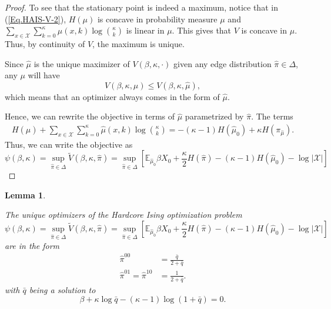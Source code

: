 \documentclass[12pt]{article}
\newtheorem{lemma}[theorem]{Lemma}
\numberwithin{equation}{section}
\begin{document}
\begin{proof}
    To see that the stationary point is indeed a maximum, notice that in (\ref{Eq.HAIS-V-2}), $H(\mu)$ is concave in probability measure $\mu$ and $\sum_{x\in\mathcal{X}}\sum_{k=0}^\kappa \mu(x, k)\log{\kappa\choose k}$ is linear in $\mu$. This gives that $V$ is concave in $\mu$. Thus, by continuity of $V$, the maximum is unique.

    Since $\widehat{\mu}$ is the unique maximizer of $V(\beta, \kappa, \cdot)$ given any edge distribution $\widehat{\pi}\in\Delta$, any $\mu$ will have
    \begin{equation*}
        V(\beta, \kappa, \mu) \leq V(\beta, \kappa, \widehat{\mu}),
    \end{equation*}
    which means that an optimizer always comes in the form of $\widehat{\mu}$.

    Hence, we can rewrite the objective in terms of $\widehat{\mu}$ parametrized by $\widehat{\pi}$. The terms
    \begin{align*}
        H(\widehat{\mu}) + \sum_{x\in\mathcal{X}}\sum_{k=0}^\kappa \widehat{\mu}(x, k)\log{\kappa\choose k} = -(\kappa-1) H(\widehat{\mu}_0) + \kappa H(\pi_{\widehat{\mu}}).
    \end{align*}
    Thus, we can write the objective as
    \begin{equation*}
        \psi(\beta, \kappa) = \sup_{\widehat{\pi}\in\Delta} \tilde{V}(\beta, \kappa, \widehat{\pi}) = \sup_{\widehat{\pi}\in\Delta} \left[\mathbb{E}_{\widehat{\mu}_0} \beta X_0 + \frac\kappa2 H(\widehat{\pi}) - (\kappa-1) H(\widehat{\mu}_0) - \log|\mathcal{X}| \right]
    \end{equation*}

\end{proof}

\begin{lemma}
    \begin{enumerate}
        The unique optimizers of the Hardcore Ising optimization problem
        \begin{equation*}
            \psi(\beta, \kappa) = \sup_{\widehat{\pi}\in\Delta} \tilde{V}(\beta, \kappa, \widehat{\pi}) = \sup_{\widehat{\pi}\in\Delta} \left[\mathbb{E}_{\widehat{\mu}_0} \beta X_0 + \frac\kappa2 H(\widehat{\pi}) - (\kappa-1) H(\widehat{\mu}_0) - \log|\mathcal{X}| \right]
        \end{equation*}
        are in the form
        \begin{equation}
            \begin{aligned}
                \widehat{\pi}^{00}                      & = \displaystyle\frac{\bar{q}}{2+\bar{q}} \\
                \widehat{\pi}^{01} = \widehat{\pi}^{10} & = \displaystyle\frac{1}{2+\bar{q}}.
            \end{aligned}
            \label{Eq.HAIS-pi-qbar}
        \end{equation}
        with $\bar{q}$ being a solution to
        \begin{equation}
            \beta + \kappa \log \bar{q} - (\kappa-1)\log (1+\bar{q}) = 0.
            \label{Eq.HAIS-q-1}
        \end{equation}
    \end{enumerate}
\end{lemma}
\end{document}
